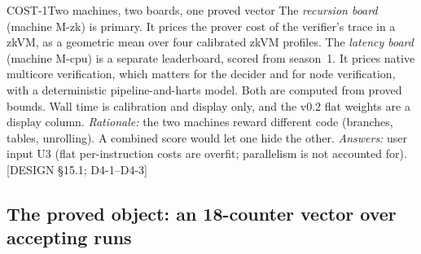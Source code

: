 \begin{decision}{COST-1}{Two machines, two boards, one proved vector}
The \emph{recursion board} (machine M-zk) is primary. It prices the prover cost of the verifier's
trace in a zkVM, as a geometric mean over four calibrated zkVM profiles. The \emph{latency board}
(machine M-cpu) is a separate leaderboard, scored from season~1. It prices native multicore
verification, which matters for the decider and for node verification, with a deterministic
pipeline-and-harts model. Both are computed from proved bounds. Wall time is calibration and display
only, and the v0.2 flat weights are a display column. \emph{Rationale:} the two machines reward
different code (branches, tables, unrolling). A combined score would let one hide the other.
\emph{Answers:} user input U3 (flat per-instruction costs are overfit; parallelism is not accounted for). [DESIGN
§15.1; D4-1--D4-3]
\end{decision}

\subsection{The proved object: an 18-counter vector over accepting runs}\label{subsec:cost-vector}

